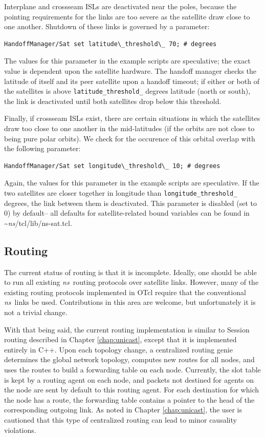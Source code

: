 Interplane and crossseam ISLs are deactivated near the poles, because 
the pointing requirements for the links are too severe as the satellite
draw close to one another.  Shutdown of these links is governed by a parameter:
\begin{verbatim}
HandoffManager/Sat set latitude\_threshold\_ 70; # degrees 
\end{verbatim}
The values for this parameter in the example scripts are speculative;
the exact value is dependent upon the satellite hardware.  The handoff
manager checks the latitude of itself and its peer satellite upon a handoff
timeout; if either or both of the satellites is above 
{\tt latitude\_threshold\_} degrees latitude (north or south), the link
is deactivated until both satellites drop below this threshold.

Finally, if crossseam ISLs exist, there are certain situations in which
the satellites draw too close to one another in the mid-latitudes (if
the orbits are not close to being pure polar orbits).  We check for
the occurence of this orbital overlap with the following parameter:
\begin{verbatim}
HandoffManager/Sat set longitude\_threshold\_ 10; # degrees 
\end{verbatim}
Again, the values for this parameter in the example scripts are speculative.
If the two satellites are closer together in longitude than 
{\tt longitude\_threshold\_} degrees, the link between them is deactivated.
This parameter is disabled (set to $0$) by default-- all defaults for
satellite-related bound variables can be found in \textasciitilde\emph{ns}/{tcl/lib/ns-sat.tcl}.



\subsection{Routing }
\label{sec:satellite/usage/routing}

The current status of routing is that it is incomplete.  Ideally, one should
be able to run all existing \emph{ns}~routing protocols over satellite links.  
However,
many of the existing routing protocols implemented in OTcl require that
the conventional \emph{ns}~links be used.  Contributions in this area are welcome,
but unfortunately it is not a trivial change.

With that being said, the current routing implementation is similar to
Session routing described in Chapter \ref{chap:unicast}, except that it
is implemented entirely in C++.   Upon each topology change, a centralized
routing genie determines the global network topology, computes new routes
for all nodes, and uses the routes to build
a forwarding table on each node.  Currently,
the slot table is kept by a routing agent on each node, and packets 
not destined for agents on the node are sent by default to this routing 
agent.  For each destination for which the node has a route, the forwarding
table contains a pointer to the head of the corresponding outgoing link.
As noted in Chapter \ref{chap:unicast}, the user is cautioned that this type 
of centralized routing can lead to minor causality violations.

